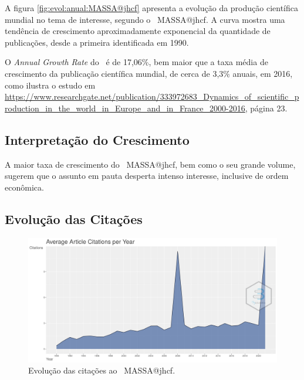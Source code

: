 A figura \ref{fig:evol:anual:MASSA@jhcf} apresenta a evolução da produção científica mundial no tema de interesse, segundo o \dataset\   MASSA@jhcf. A curva mostra uma tendência de crescimento aproximadamente exponencial da quantidade de publicações, desde a primeira identificada em 1990.

O \textit{Annual Growth Rate} do \dataset\   é de 17,06\%, bem maior que a taxa média de crescimento da publicação científica mundial, de cerca de 3,3\% anuais, em 2016, como ilustra o estudo em \url{https://www.researchgate.net/publication/333972683_Dynamics_of_scientific_production_in_the_world_in_Europe_and_in_France_2000-2016}, página 23.

\subsection{Interpretação do Crescimento} A maior taxa de crescimento do \dataset\   MASSA@jhcf, bem como o seu grande volume, sugerem que o assunto em pauta desperta intenso interesse, inclusive de ordem econômica.

\subsection{Evolução das Citações}

\begin{figure}
    \centering
    \includegraphics[width=1\textwidth]{exploratory-data-analysis/jhcf/PesqBibliogr/SimulacaoMultiagente/WoS-20210803/classico-mais-citacoes/Dataset/AverageArticleCitationPerYear-2021-08-09.png}
    \caption{Evolução das citações ao \dataset\   MASSA@jhcf.}
    \label{fig:evol:anual:citacoes:MASSA@jhcf}
\end{figure}

